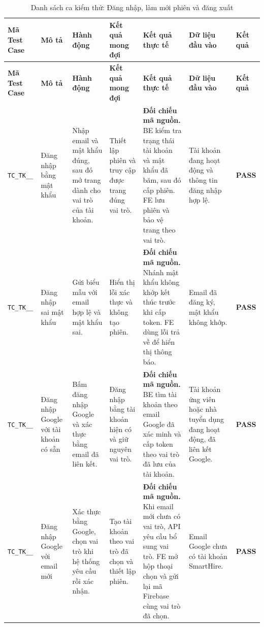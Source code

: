 \begin{landscape}
{
\fontsize{9.5}{11.5}\selectfont
\setlength{\tabcolsep}{3pt}
\renewcommand{\arraystretch}{1.2}
\begin{longtable}{|>{\raggedright\arraybackslash}p{2.1cm}|>{\raggedright\arraybackslash}p{2.8cm}|>{\raggedright\arraybackslash}p{3.8cm}|>{\raggedright\arraybackslash}p{4.0cm}|>{\raggedright\arraybackslash}p{5.0cm}|>{\raggedright\arraybackslash}p{3.2cm}|>{\centering\arraybackslash}p{1.3cm}|}
    \caption{Danh sách ca kiểm thử: Đăng nhập, làm mới phiên và đăng xuất} \label{tab:ts-tk-02} \\
    \hline
    \textbf{Mã Test Case} & \textbf{Mô tả} & \textbf{Hành động} & \textbf{Kết quả mong đợi} & \textbf{Kết quả thực tế} & \textbf{Dữ liệu đầu vào} & \textbf{Kết quả} \\
    \hline
    \endfirsthead
    \hline
    \textbf{Mã Test Case} & \textbf{Mô tả} & \textbf{Hành động} & \textbf{Kết quả mong đợi} & \textbf{Kết quả thực tế} & \textbf{Dữ liệu đầu vào} & \textbf{Kết quả} \\
    \hline
    \endhead
    \hline
    \endfoot
    \hline
    \endlastfoot
    \texttt{TC\_\allowbreak TK\_\allowbreak 02\_\allowbreak 01} & Đăng nhập bằng mật khẩu & Nhập email và mật khẩu đúng, sau đó mở trang dành cho vai trò của tài khoản. & Thiết lập phiên và truy cập được trang đúng vai trò. & \textbf{Đối chiếu mã nguồn.} BE kiểm tra trạng thái tài khoản và mật khẩu đã băm, sau đó cấp phiên. FE lưu phiên và bảo vệ trang theo vai trò. & Tài khoản đang hoạt động và thông tin đăng nhập hợp lệ. & \textbf{PASS} \\
    \hline
    \texttt{TC\_\allowbreak TK\_\allowbreak 02\_\allowbreak 02} & Đăng nhập sai mật khẩu & Gửi biểu mẫu với email hợp lệ và mật khẩu sai. & Hiển thị lỗi xác thực và không tạo phiên. & \textbf{Đối chiếu mã nguồn.} Nhánh mật khẩu không khớp kết thúc trước khi cấp token. FE dùng lỗi trả về để hiển thị thông báo. & Email đã đăng ký, mật khẩu không khớp. & \textbf{PASS} \\
    \hline
    \texttt{TC\_\allowbreak TK\_\allowbreak 02\_\allowbreak 03} & Đăng nhập Google với tài khoản có sẵn & Bấm đăng nhập Google và xác thực bằng email đã liên kết. & Đăng nhập bằng tài khoản hiện có và giữ nguyên vai trò. & \textbf{Đối chiếu mã nguồn.} BE tìm tài khoản theo email Google đã xác minh và cấp token theo vai trò đã lưu của tài khoản. & Tài khoản ứng viên hoặc nhà tuyển dụng đang hoạt động, đã liên kết Google. & \textbf{PASS} \\
    \hline
    \texttt{TC\_\allowbreak TK\_\allowbreak 02\_\allowbreak 04} & Đăng nhập Google với email mới & Xác thực bằng Google, chọn vai trò khi hệ thống yêu cầu rồi xác nhận. & Tạo tài khoản theo vai trò đã chọn và thiết lập phiên. & \textbf{Đối chiếu mã nguồn.} Khi email mới chưa có vai trò, API yêu cầu bổ sung vai trò. FE mở hộp thoại chọn và gửi lại mã Firebase cùng vai trò đã chọn. & Email Google chưa có tài khoản SmartHire. & \textbf{PASS} \\

\end{longtable}}
\end{landscape}
